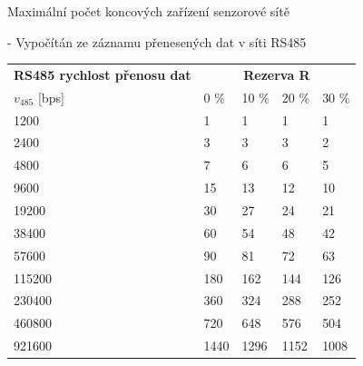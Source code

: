 \documentclass{beamer}
\begin{document}
\begin{frame} {Maximální počet koncových zařízení senzorové sítě}

	- Vypočítán ze záznamu přenesených dat v síti RS485 

	\fontsize{11}{11}\selectfont


	\begin{longtable} {|l|llll|}
			\hline
			\textbf{RS485 rychlost přenosu dat} &       \multicolumn{4}{c|}{\textbf{Rezerva R}}	  	    \\
			$v_{485}$ {[bps]}  &	0 \%	&	10 \%	&	20 \%	&	30 \%  \\ \hline
		
			1200~~~ &    1	&    1	&    1	&    1 \\
			2400~~~ &    3	&    3	&    3	&    2 \\
			4800~~~ &    7	&    6	&    6	&    5 \\
			9600~~~ &   15	&   13	&   12	&   10 \\
			19200~~~ &   30	&   27	&   24	&   21 \\
			38400~~~ &   60	&   54	&   48	&   42 \\
			57600~~~ &   90	&   81	&   72	&   63 \\
			115200~~~ &  180	&  162	&  144	&  126 \\
			230400~~~ &  360	&  324	&  288	&  252 \\
			460800~~~ &  720	&  648	&  576	&  504 \\
			921600~~~ & 1440	& 1296	& 1152	& 1008 \\
			\hline
		
		\end{longtable}
\end{frame}
\end{document}

